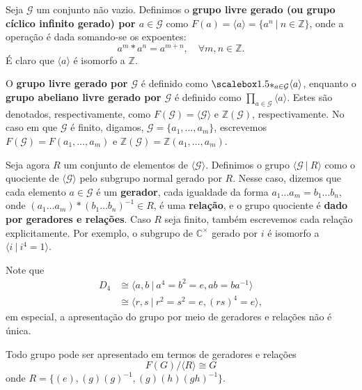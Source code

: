\begin{defi}
    Seja $\mathcal{G}$ um conjunto não vazio. Definimos o \textbf{grupo livre gerado (ou grupo cíclico infinito gerado) por $a \in \mathcal{G}$} como $F(a) = \langle a\rangle = \{a^n~|~n \in \mathbb{Z}\}$, onde a operação é dada somando-se os expoentes:
    \[a^m * a^n = a^{m+n},\quad \forall m,n \in \mathbb{Z}.\]
    É claro que $\langle a\rangle$ é isomorfo a $\mathbb{Z}$.
    
    O \textbf{grupo livre gerado por $\mathcal{G}$} é definido como $\Ast_{a\in \mathcal{G}} \langle a\rangle$, enquanto o \textbf{grupo abeliano livre gerado por $\mathcal{G}$} é definido como $\prod_{a\in \mathcal{G}} \langle a\rangle$. Estes são denotados, respectivamente, como $F(\mathcal{G}) = \langle \mathcal{G}\rangle$ e $\mathbb{Z}(\mathcal{G})$, respectivamente. No caso em que $\mathcal{G}$ é finito, digamos, 
    $\mathcal{G} = \{a_1,\ldots, a_m\}$, escrevemos $F(\mathcal{G}) = F(a_1,\ldots, a_m)$ e $\mathbb{Z}(\mathcal{G}) = \mathbb{Z}(a_1, \ldots, a_m)$.
    
    Seja agora $R$ um conjunto de elementos de $\langle\mathcal{G}\rangle$. Definimos o grupo $\langle \mathcal{G}~|~R\rangle$ como o quociente de $\langle\mathcal{G}\rangle$ pelo subgrupo normal gerado por $R$. Nesse caso, dizemos que cada elemento $a \in \mathcal{G}$ é um \textbf{gerador}, cada igualdade da forma $a_1 \ldots a_m = b_1 \ldots b_n$, onde $(a_1 \ldots a_m) * (b_1 \ldots b_n)^{-1} \in R$, é uma \textbf{relação}, e o grupo quociente é \textbf{dado por geradores e relações}. Caso $R$ seja finito, também escrevemos cada relação explicitamente. Por exemplo, o subgrupo de $\mathbb{C}^{\times}$ gerado por $i$ é isomorfo a $\langle i ~|~ i^4 = 1\rangle$.
\end{defi}

\begin{ex}
    Note que
    \begin{align*}
        D_4 &\cong \langle a,b ~|~a^4 = b^2 = e, ab = ba^{-1} \rangle\\
        &\cong  \langle r,s~|~ r^2 = s^2 = e, (rs)^4=e \rangle,
    \end{align*}
    em especial, a apresentação do grupo por meio de geradores e relações não é única.
\end{ex} 

Todo grupo pode ser apresentado em termos de geradores e relações 
\[F(G)/\langle R\rangle\cong G\]
onde $R=\{(e),(g)(g)^{-1},(g)(h)(gh)^{-1}\}.$
